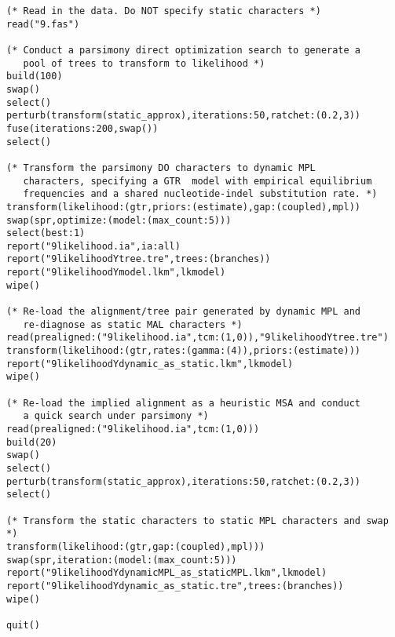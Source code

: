 \begin{verbatim}
(* Read in the data. Do NOT specify static characters *)
read("9.fas")

(* Conduct a parsimony direct optimization search to generate a
   pool of trees to transform to likelihood *)
build(100)
swap()
select()
perturb(transform(static_approx),iterations:50,ratchet:(0.2,3))
fuse(iterations:200,swap())
select()

(* Transform the parsimony DO characters to dynamic MPL
   characters, specifying a GTR  model with empirical equilibrium
   frequencies and a shared nucleotide-indel substitution rate. *)
transform(likelihood:(gtr,priors:(estimate),gap:(coupled),mpl))
swap(spr,optimize:(model:(max_count:5)))
select(best:1)
report("9likelihood.ia",ia:all)
report("9likelihoodYtree.tre",trees:(branches))
report("9likelihoodYmodel.lkm",lkmodel)
wipe()

(* Re-load the alignment/tree pair generated by dynamic MPL and
   re-diagnose as static MAL characters *)
read(prealigned:("9likelihood.ia",tcm:(1,0)),"9likelihoodYtree.tre")
transform(likelihood:(gtr,rates:(gamma:(4)),priors:(estimate)))
report("9likelihoodYdynamic_as_static.lkm",lkmodel)
wipe()

(* Re-load the implied alignment as a heuristic MSA and conduct
   a quick search under parsimony *)
read(prealigned:("9likelihood.ia",tcm:(1,0)))
build(20)
swap()
select()
perturb(transform(static_approx),iterations:50,ratchet:(0.2,3))
select()

(* Transform the static characters to static MPL characters and swap *)
transform(likelihood:(gtr,gap:(coupled),mpl)))
swap(spr,iteration:(model:(max_count:5)))
report("9likelihoodYdynamicMPL_as_staticMPL.lkm",lkmodel)
report("9likelihoodYdynamic_as_static.tre",trees:(branches))
wipe()

quit()
\end{verbatim}

